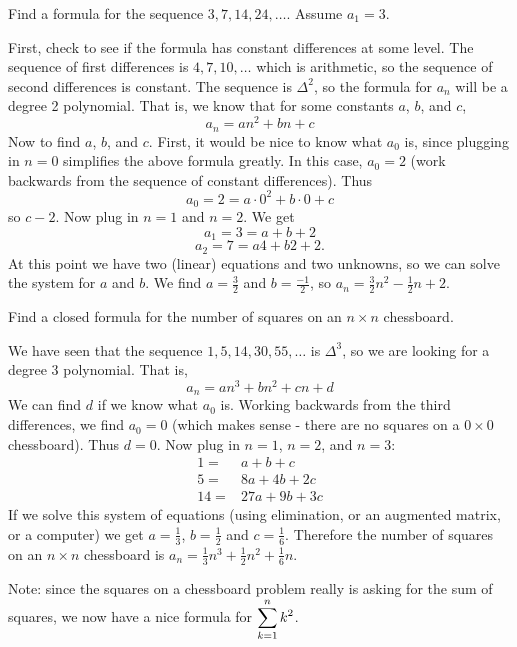 \documentclass[12pt]{article}
\begin{document}
\begin{example}
  Find a formula for the sequence $3, 7, 14, 24,\ldots$. Assume $a_1 = 3$.  
  \begin{solution}
    First, check to see if the formula has constant differences at some level.  The sequence of first differences is $4, 7, 10, \ldots$ which is arithmetic, so the sequence of second differences is constant.  The sequence is $\Delta^2$, so the formula for $a_n$ will be a degree 2 polynomial.  That is, we know that for some constants $a$, $b$, and $c$,
    \[a_n = an^2 + bn + c\]
    Now to find $a$, $b$, and $c$.  First, it would be nice to know what $a_0$ is, since plugging in $n = 0$ simplifies the above formula greatly.  In this case, $a_0 = 2$ (work backwards from the sequence of constant differences).  Thus
    \[a_0 = 2 = a\cdot 0^2 + b \cdot 0 + c\]
    so $c - 2$.  Now plug in $n =1$ and $n = 2$.  We get 
    \[a_1 = 3 = a + b + 2\]
    \[a_2 = 7 = a4 + b 2 + 2.\]  At this point we have two (linear) equations and two unknowns, so we can solve the system for $a$ and $b$.  We find $a = \frac{3}{2}$ and $b = \frac{-1}{2}$, so $a_n = \frac{3}{2} n^2 - \frac{1}{2}n + 2$.
  \end{solution}

\end{example}


\begin{example}
  Find a closed formula for the number of squares on an $n \times n$ chessboard.
  \begin{solution}
    We have seen that the sequence $1, 5, 14, 30, 55, \ldots$ is $\Delta^3$, so we are looking for a degree 3 polynomial.  That is, 
    \[a_n = an^3 + bn^2 + cn + d\]
    We can find $d$ if we know what $a_0$ is.  Working backwards from the third differences, we find $a_0 = 0$ (which makes sense - there are no squares on a $0\times 0$ chessboard).  Thus $d = 0$.  Now plug in $n = 1$, $n =2$, and $n =3$:
    \begin{align*}
      1 = & a + b + c \\
      5 = & 8a + 4b + 2c \\
      14 = & 27a + 9b + 3c
    \end{align*}
    If we solve this system of equations (using elimination, or an augmented matrix, or a computer) we get $a = \frac{1}{3}$, $b = \frac{1}{2}$ and $c = \frac{1}{6}$.  Therefore the number of squares on an $n \times n$ chessboard is $a_n = \frac{1}{3}n^3 + \frac{1}{2}n^2 + \frac{1}{6}n$.
  \end{solution}
  Note: since the squares on a chessboard problem really is asking for the sum of squares, we now have a nice formula for $\displaystyle\sum_{k=1}^n k^2$.
\end{example}
\end{document}
